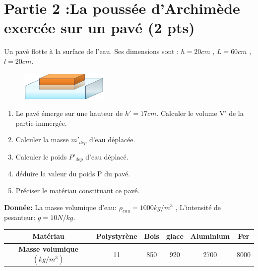 \documentclass[12pt]{article}
\begin{document}
\vspace{3cm}

\hrulefill\\
\section*{Partie 2 :La poussée d'Archimède exercée sur un pavé \dotfill(2 pts)}
Un pavé flotte à la surface de l’eau. Ses dimensions sont : $h = 20 cm$ ,  $L = 60 cm$ ,  $l = 20 cm$.

\begin{figure}
	\vspace{-4.3cm}

	
 \begin{center}
	 \hspace{-3cm}	\includegraphics[width=0.38\textwidth]{./img/img01.png}
\end{center}
\end{figure}
\begin{enumerate}
	\item  Le pavé émerge sur une hauteur de $h' = 17 cm$. Calculer le volume V' de la partie immergée.

	\item  Calculer la masse $m'_{dep}$ d’eau déplacée.
	\item  Calculer le poids $P'_{dep}$ d’eau déplacé.
	\item  déduire la valeur du poids P du pavé.
	\item  Préciser le matériau constituant ce pavé.\dotfill{1pt}
\end{enumerate}

\textbf{Donnée: } La masse volumique d'eau: $\rho_{eau} = 1000 kg/m^3$ , L'intensité de pesanteur: $g = 10N/kg$.

\begin{center}
\begin{tabular}{ |c| c| c| c|c|c| }
	\hline
	\textbf{Matériau}                   & Polystyrène & Bois &glace &Aluminium&Fer\\\hline 
	\textbf{Masse volumique} $(kg/m^3)$ & 11 & 850 &920 &2700& 8000\\\hline
\end{tabular}
\end{center}
\end{document}

